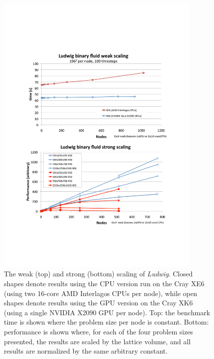 \begin{figure}[!t]
\centering
\includegraphics[width=10cm]{Chapters/chapter14/figures/two_graphs_ud}
\caption{The weak (top) and strong (bottom) scaling of \textit{Ludwig}.  Closed
  shapes denote results using the CPU version run on the Cray
  XE6 (using two 16-core AMD Interlagos CPUs per node), while open
  shapes denote results using the GPU version on the Cray XK6 (using a
  single NVIDIA X2090 GPU per node). Top: the benchmark time is shown
  where the problem size per node is constant. Bottom: performance is
  shown where, for each of the four problem sizes presented, the
  results are scaled by the lattice volume, and all results are
  normalized by the same arbitrary constant.  }
\label{ch14:fig:scaling}
\end{figure}



